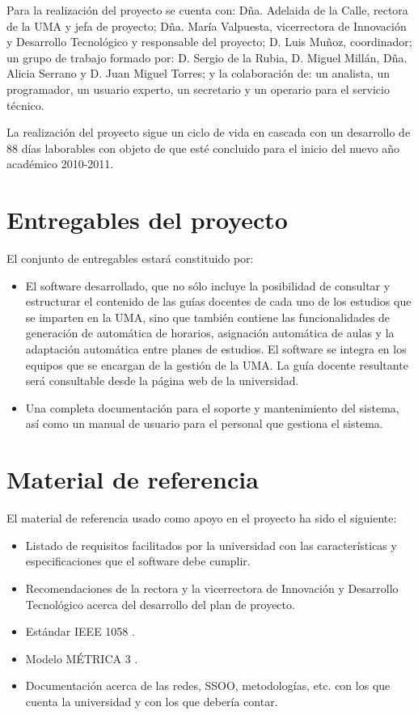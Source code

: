 \documentclass[11pt,a4paper,spanish,twoside]{report}
\begin{document}
Para la realización del proyecto se cuenta con: Dña. Adelaida de la Calle, 
rectora de la UMA y jefa de proyecto; Dña. María Valpuesta, vicerrectora de 
Innovación y Desarrollo Tecnológico y responsable del proyecto; D. Luis 
Muñoz, coordinador; un grupo de trabajo formado por: D. Sergio de la Rubia, 
D. Miguel Millán, Dña. Alicia Serrano y D. Juan Miguel Torres; y la 
colaboración de: un analista, un programador, un usuario experto, un 
secretario y un operario para el servicio técnico.

La realización del proyecto sigue un ciclo de vida en cascada con un 
desarrollo de 88 días laborables con objeto de que esté concluido para el 
inicio del nuevo año académico 2010-2011.

\section{Entregables del proyecto}
El conjunto de entregables estará constituido por:
\begin{itemize}
\item El software desarrollado, que no sólo incluye la posibilidad de
  consultar y estructurar el contenido de las guías docentes de cada uno de
  los estudios que se imparten en la UMA, sino que también contiene las
  funcionalidades de generación de automática de horarios, asignación
  automática de aulas y la adaptación automática entre planes de estudios. El
  software se integra en los equipos que se encargan de la gestión de la
  UMA. La guía docente resultante será consultable desde la página web de la
  universidad.
\item Una completa documentación para el soporte y mantenimiento del sistema,
  así como un manual de usuario para el personal que gestiona el sistema. 
\end{itemize}

\section{Material de referencia}
El material de referencia usado como apoyo en el proyecto ha sido el siguiente:
\begin{itemize}
\item Listado de requisitos facilitados por la universidad con las 
  características y especificaciones que el software debe cumplir.
\item Recomendaciones de la rectora y la vicerrectora de Innovación y 
  Desarrollo Tecnológico acerca del desarrollo del plan de proyecto.
\item Estándar IEEE 1058 \cite{ieee}.
\item Modelo MÉTRICA 3 \cite{met}.
\item Documentación acerca de las redes, SSOO, metodologías, etc. con los que 
  cuenta la universidad y con los que debería contar.
\end{itemize}
\end{document}

